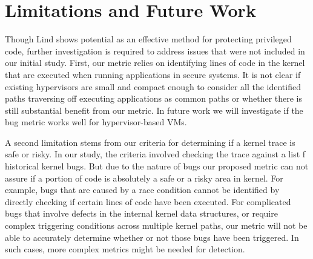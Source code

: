 \section{Limitations and Future Work}
\label{sec.limitation}

Though Lind shows potential as an effective method for protecting privileged code,
further investigation is required to address issues that were not included in our
initial study.
First, our metric relies on identifying lines of code in the kernel that are
 executed when running applications in secure systems. It is not clear if
 existing hypervisors are small and compact enough to consider all the
 identified paths traversing off executing applications as common paths or
  whether there is still substantial benefit from our metric. In %
future work we will %
investigate if the bug metric works well for %
hypervisor-based VMs.

A second limitation stems from our criteria for determining if a kernel trace is
safe or risky. In our study, the criteria involved checking the trace against a list
 f historical kernel bugs.
But due to the nature of bugs our proposed metric can not assure if a portion of code
is absolutely a safe or a risky area in kernel. For example, bugs that are caused
by a race condition cannot be identified by directly checking if certain lines of
code have been executed. For complicated bugs that involve defects in the internal
kernel data structures, or require complex triggering conditions across multiple
kernel paths, our metric will not be able to accurately determine whether or not
those bugs have been triggered. In such cases, more complex metrics might be needed
 for detection.



